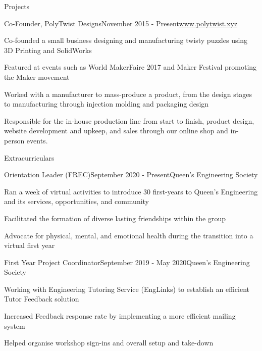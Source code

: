 \documentclass{resume} %
\begin{document}
\begin{rSection}{Projects}

\begin{rSubsection}{Co-Founder, PolyTwist Designs}{November 2015 - Present}{\url{www.polytwist.xyz}}{}
\item Co-founded a small business designing and manufacturing twisty puzzles using 3D Printing and SolidWorks
\item Featured at events such as World MakerFaire 2017 and Maker Festival promoting the Maker movement
\item Worked with a manufacturer to mass-produce a product, from the design stages to manufacturing through injection molding and packaging design
\item Responsible for the in-house production line from start to finish, product design, website development and upkeep, and sales through our online shop and in-person events.
\end{rSubsection}

\end{rSection}


\begin{rSection}{Extracurriculars}

\begin{rSubsection}{Orientation Leader (FREC)}{September 2020 - Present}{Queen's Engineering Society}{}
\item Ran a week of virtual activities to introduce 30 first-years to Queen's Engineering and its services, opportunities, and community
\item Facilitated the formation of diverse lasting friendships within the group
\item Advocate for physical, mental, and emotional health during the transition into a virtual first year
\end{rSubsection}

\begin{rSubsection}{First Year Project Coordinator}{September 2019 - May 2020}{Queen's Engineering Society}{}
\item Working with Engineering Tutoring Service (EngLinks) to establish an efficient Tutor Feedback solution
\item Increased Feedback response rate by implementing a more efficient mailing system
\item Helped organise workshop sign-ins and overall setup and take-down
\end{rSubsection}

\end{rSection}
\end{document}
